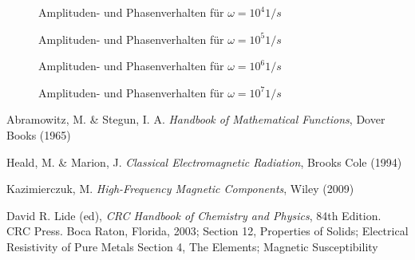 \documentclass[10pt,a4paper]{article}
\begin{document}
\begin{figure}[htbp]
\centering
\scalebox{1.0}{}
\caption{Amplituden- und Phasenverhalten für $\omega=10^4 1/s$}
\end{figure}
\begin{figure}[htbp]
\centering
\scalebox{1.0}{}
\caption{Amplituden- und Phasenverhalten für $\omega=10^5 1/s$}
\end{figure}
\begin{figure}[htbp]
\centering
\scalebox{1.0}{}
\caption{Amplituden- und Phasenverhalten für $\omega=10^6 1/s$}
\end{figure}
\begin{figure}[htbp]
\centering
\scalebox{1.0}{}
\caption{Amplituden- und Phasenverhalten für $\omega=10^7 1/s$}
\end{figure}
\begin{thebibliography}{9}

Abramowitz, M. \& Stegun, I. A.
\emph{Handbook of Mathematical Functions},
Dover Books (1965)

Heald, M. \& Marion, J.
\emph{Classical Electromagnetic Radiation},
Brooks Cole (1994)

Kazimierczuk, M.
\emph{High-Frequency Magnetic Components},
Wiley (2009)

David R. Lide (ed),
\emph{CRC Handbook of Chemistry and Physics},
84th Edition. CRC Press. Boca Raton, Florida, 2003;
Section 12, Properties of Solids; Electrical Resistivity of Pure Metals
Section 4, The Elements; Magnetic Susceptibility

\end{thebibliography}
\end{document}
